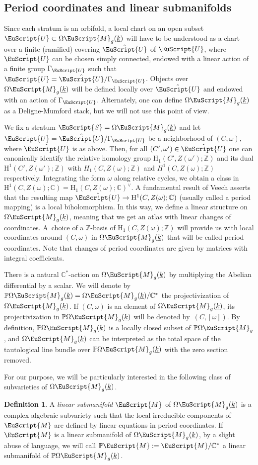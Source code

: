 \documentclass[10pt]{amsart}
\let\mathcal\EuScript
\theoremstyle{plain}
\theoremstyle{definition}
\newtheorem{Definition}[Theorem]{Definition}
\def\C{\mathbb{C}}
\newcommand\Z{\mathbb{Z}}
\newcommand{\Pb}{\mathbb{P}}
\newcommand{\Mcal}{\mathcal{M}}
\newcommand{\cM}{\mathcal{M}}
\newcommand{\cS}{\mathcal{S}}
\newcommand{\cU}{\mathcal{U}}
\let\omg\omega
\let\ul\underline
\newcommand{\HH}{\mathrm{H}}
\newcommand{\trate}{\Omega\Mcal_{g}(\ul{k})}
\begin{document}
\subsection{Period coordinates and linear submanifolds}\label{sec:local:coord}
Since each stratum is an orbifold, a local chart on an open subset $\cU\subset\trate$ will have to be understood as a chart over a finite (ramified) covering $\hat\cU$ of $\cU$, where $\hat\cU$ can be chosen simply connected, endowed with a linear action of a finite group $\Gamma_\cU$ such that $\cU=\hat\cU/\Gamma_\cU$. Objects over $\trate$ will be defined locally over $\hat\cU$ and endowed with an action of $\Gamma_\cU$. Alternately, one can define $\trate$ as a Deligne-Mumford stack, but we will not use this point of view.

We fix a stratum $\cS=\trate$ and let $\cU=\hat\cU/\Gamma_\cU$ be a neighborhood of $(C,\omega)$, where $\hat\cU$ is as above. Then, for all $(C',\omega')\in\hat\cU$ one can canonically identify the relative homology group $\HH_1(C', Z(\omega'); \Z)$ and its dual $\HH^1(C', Z(\omega'); \Z)$ with $H_1(C,Z(\omega);\Z)$ and $H^1(C,Z(\omega);\Z)$ respectively.
Integrating the form $\omega$ along relative cycles, we obtain a class in $\HH^1(C,Z(\omega); \C)=\HH_{1}(C,Z(\omega); \C)^\vee$. A fundamental result of Veech \cite{Veech90} asserts that the resulting map $\hat\cU\to \HH^1 (C, Z(\omega); \C)$
(usually called a period mapping) is a local biholomorphism. In this way, we define a linear structure on $\trate$, meaning that we get an atlas with linear changes of coordinates. A~choice of a $\Z$-basis of $\HH_1 (C, Z(\omega); \Z)$ will provide us with local coordinates around $(C, \omega)$ in $\trate$ that will be called period coordinates. Note that changes of period coordinates are given by matrices with integral coefficients.

There is a natural $\C^*$-action on $\trate$ by multiplying the Abelian differential by a scalar.
We will denote by $\Pb\trate=\trate/\C^*$ the projectivization of $\trate$.
If $(C,\omg)$ is an element of $\trate$, its projectivization in $\Pb\trate$ will be denoted by~$(C,[\omg])$.
By definition, $\Pb\trate$ is a locally closed subset of $\Pb\Omega\cM_g$, and $\trate$ can be interpreted as the total space of the tautological line bundle over $\Pb\trate$ with the zero section removed.

For our purpose, we will be particularly interested in the following class of subvarieties of $\trate$.

\begin{Definition}\label{def:lin:man}
A \emph{linear submanifold} $\cM$ of $\trate$ is a complex algebraic subvariety such that the local irreducible components of $\cM$ are defined by linear equations in period coordinates.
If $\cM$ is a linear submanifold of $\trate$, by a slight abuse of language, we will call $\Pb\cM:=\cM/\C^*$ a linear submanifold of $\Pb\trate$.
\end{Definition}
\end{document}
